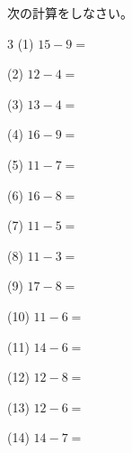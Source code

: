 \documentclass[a4paper, 11pt]{ltjsarticle}
\begin{document}
\hfill

\vspace*{2ex}
次の計算をしなさい。
\vspace*{5ex}

\begin{multicols*}{3}
\noindent (1) \quad $15 - 9 =$
\vspace*{\fill}

\noindent (2) \quad $12 - 4 =$
\vspace*{\fill}

\noindent (3) \quad $13 - 4 =$
\vspace*{\fill}

\noindent (4) \quad $16 - 9 =$
\vspace*{\fill}

\noindent (5) \quad $11 - 7 =$
\vspace*{\fill}

\noindent (6) \quad $16 - 8 =$
\vspace*{\fill}

\noindent (7) \quad $11 - 5 =$
\vspace*{\fill}

\noindent (8) \quad $11 - 3 =$
\vspace*{\fill}

\noindent (9) \quad $17 - 8 =$
\vspace*{\fill}

\noindent (10) \quad $11 - 6 =$
\vspace*{\fill}

\noindent (11) \quad $14 - 6 =$
\vspace*{\fill}

\noindent (12) \quad $12 - 8 =$
\vspace*{\fill}
\columnbreak

\noindent (13) \quad $12 - 6 =$
\vspace*{\fill}

\noindent (14) \quad $14 - 7 =$
\vspace*{\fill}


\end{multicols*}
\end{document}
